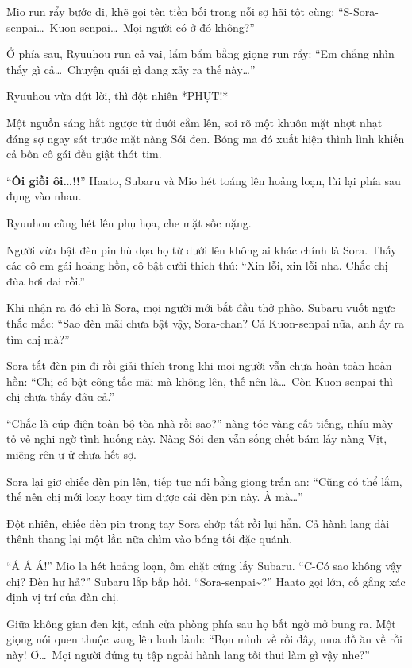 \documentclass[../main.tex]{subfiles}
\begin{document}

Mio run rẩy bước đi, khẽ gọi tên tiền bối trong nỗi sợ hãi tột cùng: ``S-Sora-senpai\dots\ Kuon-senpai\dots\ Mọi người có ở đó không?''

Ở phía sau, Ryuuhou run cả vai, lẩm bẩm bằng giọng run rẩy: ``Em chẳng nhìn thấy gì cả\dots\ Chuyện quái gì đang xảy ra thế này\dots''


Ryuuhou vừa dứt lời, thì đột nhiên *PHỤT!*

Một nguồn sáng hắt ngược từ dưới cằm lên, soi rõ một khuôn mặt nhợt nhạt đáng sợ ngay sát trước mặt nàng Sói đen. Bóng ma đó xuất hiện thình lình khiến cả bốn cô gái đều giật thót tim.

``\textbf{Ôi giồi ôi\dots!!}'' Haato, Subaru và Mio hét toáng lên hoảng loạn, lùi lại phía sau đụng vào nhau.

Ryuuhou cũng hét lên phụ họa, che mặt sốc nặng.

Người vừa bật đèn pin hù dọa họ từ dưới lên không ai khác chính là Sora. Thấy các cô em gái hoảng hồn, cô bật cười thích thú: ``Xin lỗi, xin lỗi nha. Chắc chị đùa hơi dai rồi.''

Khi nhận ra đó chỉ là Sora, mọi người mới bắt đầu thở phào. Subaru vuốt ngực thắc mắc: ``Sao đèn mãi chưa bật vậy, Sora-chan? Cả Kuon-senpai nữa, anh ấy ra tìm chị mà?''

Sora tắt đèn pin đi rồi giải thích trong khi mọi người vẫn chưa hoàn toàn hoàn hồn: ``Chị có bật công tắc mãi mà không lên, thế nên là\dots\ Còn Kuon-senpai thì chị chưa thấy đâu cả.''

``Chắc là cúp điện toàn bộ tòa nhà rồi sao?'' nàng tóc vàng cất tiếng, nhíu mày tỏ vẻ nghi ngờ tình huống này. Nàng Sói đen vẫn sống chết bám lấy nàng Vịt, miệng rên ư ử chưa hết sợ.

Sora lại giơ chiếc đèn pin lên, tiếp tục nói bằng giọng trấn an: ``Cũng có thể lắm, thế nên chị mới loay hoay tìm được cái đèn pin này. À mà\dots''

Đột nhiên, chiếc đèn pin trong tay Sora chớp tắt rồi lụi hẳn. Cả hành lang dài thênh thang lại một lần nữa chìm vào bóng tối đặc quánh.

``Á Á Á!'' Mio la hét hoảng loạn, ôm chặt cứng lấy Subaru.
``C-Có sao không vậy chị? Đèn hư hả?'' Subaru lắp bắp hỏi.
``Sora-senpai\~{}?'' Haato gọi lớn, cố gắng xác định vị trí của đàn chị.


Giữa không gian đen kịt, cánh cửa phòng phía sau họ bất ngờ mở bung ra. Một giọng nói quen thuộc vang lên lanh lảnh: ``Bọn mình về rồi đây, mua đồ ăn về rồi này! Ơ\dots\ Mọi người đứng tụ tập ngoài hành lang tối thui làm gì vậy nhe?''
\end{document}
